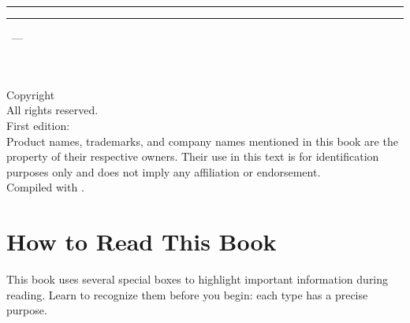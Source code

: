 
\begin{titlepage}
\centering
\vspace*{2cm}

{\color{manning-red}\rule{\textwidth}{2pt}}
\vspace{1.5cm}

{\fontsize{28}{34}\selectfont\sffamily\bfseries\color{manning-dark} \BookTitle\par}
\vspace{0.8cm}
{\Large\sffamily\color{manning-gray} \BookSubtitle\par}
\vspace{2.5cm}
{\large\sffamily \BookAuthor\par}
\vfill

{\color{manning-red}\rule{\textwidth}{2pt}}
\vspace{0.5cm}
{\normalsize\sffamily\color{manning-gray} \BookEdition\ --- \BookYear\par}
\end{titlepage}

\thispagestyle{empty}
\vspace*{\fill}
\noindent\textsf{\textbf{\BookTitle}}\\
\textsf{\textit{\BookSubtitle}}\\[1em]
\noindent Copyright \textcopyright\ \BookYear\ \BookCopyright\\
All rights reserved.\\[1em]
\noindent First edition: \BookMonth\ \BookYear\\[1em]
\noindent Product names, trademarks, and company names mentioned in this book are the property of their respective owners. Their use in this text is for identification purposes only and does not imply any affiliation or endorsement.\\[1em]
\noindent Compiled with \LuaLaTeX.
\newpage

\chapter*{How to Read This Book}

This book uses several special boxes to highlight important information during reading. Learn to recognize them before you begin: each type has a precise purpose.

